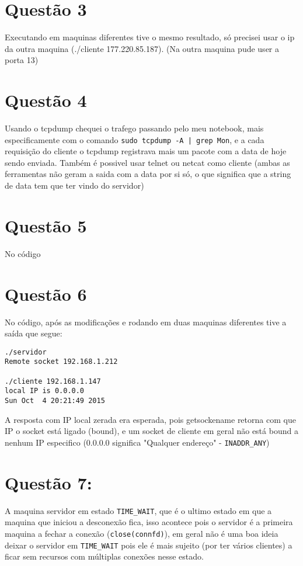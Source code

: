 \documentclass[11pt]{article}
\begin{document}
\section*{Questão 3}
\label{sec-3}
Executando em maquinas diferentes tive o mesmo resultado, só precisei
usar o ip da outra maquina (./cliente 177.220.85.187). (Na outra
maquina pude user a porta 13)

\section*{Questão 4}
\label{sec-4}
Usando o tcpdump chequei o trafego passando pelo meu notebook, mais
especificamente com o comando \texttt{sudo tcpdump -A | grep Mon}, e a cada
requisição do cliente o tcpdump registrava mais um pacote com a data
de hoje sendo enviada. Também é possivel usar telnet ou netcat como
cliente (ambas as ferramentas não geram a saida com a data por si só,
o que significa que a string de data tem que ter vindo do servidor)

\section*{Questão 5}
\label{sec-5}
No código

\section*{Questão 6}
\label{sec-6}
No código, após as modificações e rodando em duas maquinas diferentes
tive a saída que segue:

\begin{verbatim}
./servidor
Remote socket 192.168.1.212

./cliente 192.168.1.147
local IP is 0.0.0.0
Sun Oct  4 20:21:49 2015
\end{verbatim}

A resposta com IP local zerada era esperada, pois getsockename retorna
com que IP o socket está ligado (bound), e um socket de cliente em
geral não está bound a nenhum IP especifico (0.0.0.0 significa
"Qualquer endereço" - \texttt{INADDR\_ANY})

\section*{Questão 7:}
\label{sec-7}

A maquina servidor em estado \texttt{TIME\_WAIT}, que é o ultimo estado em que
a maquina que iniciou a desconexão fica, isso acontece pois o servidor
é a primeira maquina a fechar a conexão (\verb~close(connfd)~), em geral
não é uma boa ideia deixar o servidor em \texttt{TIME\_WAIT} pois ele é mais
sujeito (por ter vários clientes) a ficar sem recursos com múltiplas
conexões nesse estado.
\end{document}
